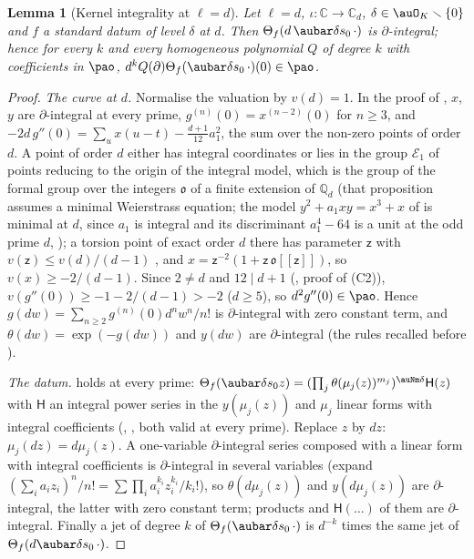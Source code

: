 \documentclass[10pt]{amsart}
\newtheorem{lemma}[theorem]{Lemma}
\theoremstyle{definition}
\theoremstyle{remark}
\newcommand{\C}{\mathbb C}
\newcommand{\Q}{\mathbb Q}
\begin{document}
\begin{lemma}[Kernel integrality at $\ell=d$]\label{pex:dint}
Let $\ell=d$, $\iota\colon\C\to\C_d$, $\delta\in\auO_K\smallsetminus\{0\}$ and $f$ a standard datum of
level $\delta$ at $d$. Then $\Theta_f(d\,\aubar\delta s_0\,\cdot)$ is $\partial$-integral; hence for every
$k$ and every homogeneous polynomial $Q$ of degree $k$ with coefficients in $\pao$, $d^kQ(\partial)
\Theta_f(\aubar\delta s_0\,\cdot)(0)\in\pao$.
\end{lemma}
\begin{proof}
\emph{The curve at $d$.} Normalise the valuation by $v(d)=1$. In the proof of
{\cite[Proposition~5.25(C2)]{P49}}, $x$, $y$ are $\partial$-integral at every prime, $g^{(n)}(0)=x^{(n-2)}(0)$
for $n\ge3$, and $-2d\,g''(0)=\sum_{u}x(u-t)-\tfrac{d+1}{12}a_1^2$, the sum over the non-zero points of
order $d$. A point of order $d$ either has integral coordinates or lies in the group $\mathcal E_1$ of
points reducing to the origin of the integral model, which is the group of the formal group over the
integers $\mathfrak o$ of a finite extension of $\Q_d$ \cite[Chapter~VII, Proposition~2.2]{SilvermanAEC} (that proposition
assumes a minimal Weierstrass equation; the model $y^2+a_1xy=x^3+x$ of {\cite[(25)]{P49}} is
minimal at $d$, since $a_1$ is integral and its discriminant $a_1^4-64$ is a unit at the odd prime $d$,
{\cite[Lemma~4.5]{P49}}); a torsion point of
exact order $d$ there has parameter $\mathsf z$ with $v(\mathsf z)\le v(d)/(d-1)$
\cite[Chapter~IV, Theorem~6.1]{SilvermanAEC}, and $x=\mathsf z^{-2}(1+\mathsf z\,\mathfrak o[[\mathsf z]])$,
so $v(x)\ge-2/(d-1)$. Since $2\ne d$ and $12\mid d+1$ ({\cite[Proposition~5.25]{P49}}, proof of (C2)),
$v(g''(0))\ge-1-2/(d-1)>-2$ ($d\ge5$), so $d^2g''(0)\in\pao$. Hence $g(dw)=\sum_{n\ge2}g^{(n)}(0)d^nw^n/n!$
is $\partial$-integral with zero constant term, and $\theta(dw)=\exp(-g(dw))$ and $y(dw)$ are
$\partial$-integral (the rules recalled before {\cite[Proposition~5.25]{P49}}).

\emph{The datum.} {\cite[Theorem~7.15]{P49}} holds at every prime: $\Theta_f(\aubar\delta s_0z)=(\prod_j\theta
(\mu_j(z))^{m_j})^{\auNm\delta}\mathsf H(z)$ with $\mathsf H$ an integral power series in the
$y(\mu_j(z))$ and $\mu_j$ linear forms with integral coefficients ({\cite[Lemma~7.12]{P49}},
{\cite[Corollary~7.3]{P49}}, both valid at every prime). Replace $z$ by $dz$: $\mu_j(dz)=d\mu_j(z)$. A
one-variable $\partial$-integral series composed with a linear form with integral coefficients is
$\partial$-integral in several variables (expand $(\sum_ia_iz_i)^n/n!=\sum\prod_ia_i^{k_i}z_i^{k_i}/k_i!$),
so $\theta(d\mu_j(z))$ and $y(d\mu_j(z))$ are $\partial$-integral, the latter with zero constant term;
products and $\mathsf H(\dots)$ of them are $\partial$-integral. Finally a jet of degree $k$ of
$\Theta_f(\aubar\delta s_0\,\cdot)$ is $d^{-k}$ times the same jet of $\Theta_f(d\aubar\delta s_0\,\cdot)$.
\end{proof}
\end{document}
